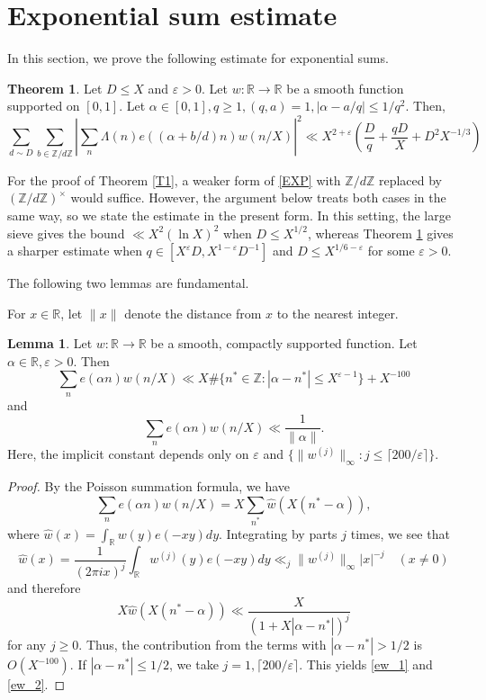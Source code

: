 \documentclass{amsart}
\theoremstyle{definition}
\newtheorem{lem}[dfn]{Lemma}
\newtheorem{thm}[dfn]{Theorem}
\theoremstyle{remark}
\newcommand{\1}{
    \bm{1}
}
\newcommand{\pZ}[1]{
(\mathbb{Z}/{ #1 \mathbb{Z}})^{\times}
}
\newcommand{\aZ}[1]{
\mathbb{Z}/{ #1 \mathbb{Z}}
}
\begin{document}
\section{Exponential sum estimate}


In this section, we prove the following estimate for exponential sums. 


\begin{thm}\label{Lmb}
Let $D \leq X$ and $\varepsilon>0$. 
Let $w:\mathbb{R} \to \mathbb{R}$ be a smooth function supported on $[0,1]$. 
Let $\alpha \in [0,1], q \geq 1, (q,a)=1, |\alpha-a/q| \leq 1/q^2$. Then,
\begin{equation} \sum_{d \sim D} \sum_{b \in \aZ{d}} \left| \sum_{n} \Lambda(n) e((\alpha+b/d)n) w(n/X) \right|^2 \ll X^{2+\varepsilon} \left( \frac{D}{q} + \frac{qD}{X} + D^2 X^{-1/3} \right) \label{EXP} \end{equation}
\end{thm}

For the proof of Theorem \ref{T1}, a weaker form of \eqref{EXP} with $\aZ{d}$ replaced by $\pZ{d}$ would suffice. However, the argument below treats both cases in the same way, so we state the estimate in the present form.
In this setting, the large sieve gives the bound $\ll X^2(\ln X)^2$ when $D \leq X^{1/2}$, whereas Theorem \ref{Lmb} gives a sharper estimate when $q \in [X^{\varepsilon}D,X^{1-\varepsilon}D^{-1}]$ and $D \leq X^{1/6 - \varepsilon}$ for some $\varepsilon>0$.  



The following two lemmas are fundamental. 

For $x \in \mathbb{R}$, let $\|x\|$ denote the distance from $x$ to the nearest integer. 
\begin{lem}\label{sumw}
Let $w:\mathbb{R} \to \mathbb{R}$ be a smooth, compactly supported function. 
Let $\alpha \in \mathbb{R}, \varepsilon>0$. Then
\begin{equation} \sum_{n} e(\alpha n) w(n/X) \ll X\#\{ n^* \in \mathbb{Z} : |\alpha - n^*| \leq X^{\varepsilon-1} \} + X^{-100} \label{ew_1} \end{equation}
and
\begin{equation} \sum_{n} e(\alpha n) w(n/X) \ll \frac{1}{\|\alpha\|}. \label{ew_2} \end{equation}
Here, the implicit constant depends only on $\varepsilon$ and $\{\|w^{(j)}\|_{\infty} : j \leq \lceil 200/\varepsilon \rceil \}$. 
\end{lem}

\begin{proof}
By the Poisson summation formula, we have
\[ \sum_{n} e(\alpha n) w(n/X) = X \sum_{n^*} \hat{w}(X(n^*-\alpha)), \]
where $\hat{w}(x) = \int_{\mathbb{R}} w(y) e(-xy) dy$. Integrating by parts $j$ times, we see that
\[ \hat{w}(x) = \frac{1}{(2\pi i x)^j} \int_{\mathbb{R}} w^{(j)}(y) e(-xy) dy \ll_j \|w^{(j)}\|_{\infty} |x|^{-j} \quad (x \neq 0) \]
and therefore
\[ X \hat{w}(X(n^*-\alpha)) \ll \frac{X}{(1+X|\alpha-n^*|)^j} \]
for any $j \geq 0$. Thus, the contribution from the terms with $|\alpha-n^*|>1/2$ is $O(X^{-100})$. 
If $|\alpha-n^*|\leq1/2$, we take $j=1, \lceil 200/\varepsilon \rceil$. This yields \eqref{ew_1} and \eqref{ew_2}. 
\end{proof}
\end{document}
